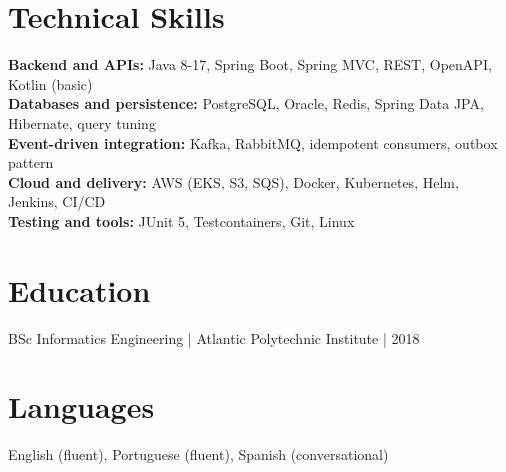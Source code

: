 \documentclass[10pt,a4paper]{article}
\begin{document}
\section*{Technical Skills}
\textbf{Backend and APIs:} Java 8-17, Spring Boot, Spring MVC, REST, OpenAPI, Kotlin (basic)\\
\textbf{Databases and persistence:} PostgreSQL, Oracle, Redis, Spring Data JPA, Hibernate, query tuning\\
\textbf{Event-driven integration:} Kafka, RabbitMQ, idempotent consumers, outbox pattern\\
\textbf{Cloud and delivery:} AWS (EKS, S3, SQS), Docker, Kubernetes, Helm, Jenkins, CI/CD\\
\textbf{Testing and tools:} JUnit 5, Testcontainers, Git, Linux

\section*{Education}
BSc Informatics Engineering | Atlantic Polytechnic Institute | 2018

\section*{Languages}
English (fluent), Portuguese (fluent), Spanish (conversational)
\end{document}
